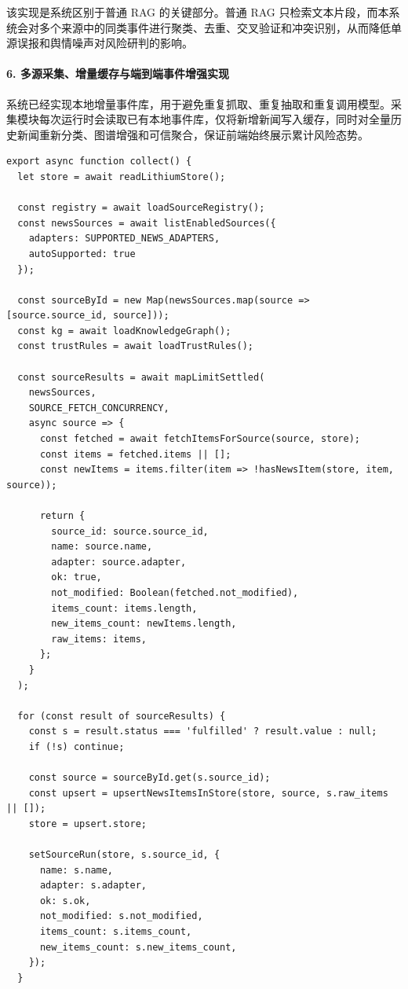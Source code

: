 \documentclass[12pt,a4paper]{article}
\begin{document}
该实现是系统区别于普通 RAG 的关键部分。普通 RAG 只检索文本片段，而本系统会对多个来源中的同类事件进行聚类、去重、交叉验证和冲突识别，从而降低单源误报和舆情噪声对风险研判的影响。

\paragraph{6. 多源采集、增量缓存与端到端事件增强实现}

系统已经实现本地增量事件库，用于避免重复抓取、重复抽取和重复调用模型。采集模块每次运行时会读取已有本地事件库，仅将新增新闻写入缓存，同时对全量历史新闻重新分类、图谱增强和可信聚合，保证前端始终展示累计风险态势。

\begin{lstlisting}[style=projectcode,caption={多源采集、增量入库、图谱增强与可信聚合流程}]
export async function collect() {
  let store = await readLithiumStore();

  const registry = await loadSourceRegistry();
  const newsSources = await listEnabledSources({
    adapters: SUPPORTED_NEWS_ADAPTERS,
    autoSupported: true
  });

  const sourceById = new Map(newsSources.map(source => [source.source_id, source]));
  const kg = await loadKnowledgeGraph();
  const trustRules = await loadTrustRules();

  const sourceResults = await mapLimitSettled(
    newsSources,
    SOURCE_FETCH_CONCURRENCY,
    async source => {
      const fetched = await fetchItemsForSource(source, store);
      const items = fetched.items || [];
      const newItems = items.filter(item => !hasNewsItem(store, item, source));

      return {
        source_id: source.source_id,
        name: source.name,
        adapter: source.adapter,
        ok: true,
        not_modified: Boolean(fetched.not_modified),
        items_count: items.length,
        new_items_count: newItems.length,
        raw_items: items,
      };
    }
  );

  for (const result of sourceResults) {
    const s = result.status === 'fulfilled' ? result.value : null;
    if (!s) continue;

    const source = sourceById.get(s.source_id);
    const upsert = upsertNewsItemsInStore(store, source, s.raw_items || []);
    store = upsert.store;

    setSourceRun(store, s.source_id, {
      name: s.name,
      adapter: s.adapter,
      ok: s.ok,
      not_modified: s.not_modified,
      items_count: s.items_count,
      new_items_count: s.new_items_count,
    });
  }


\end{lstlisting}
\end{document}
